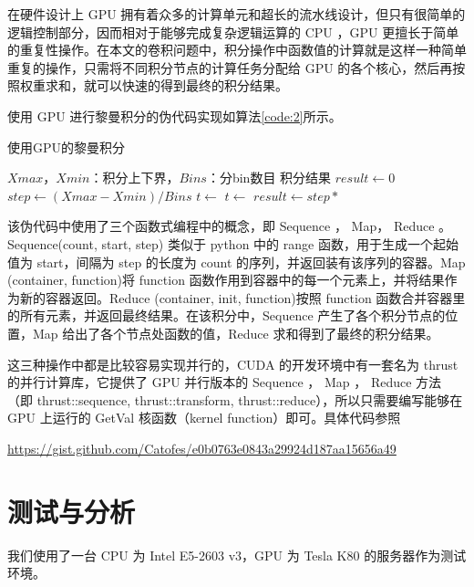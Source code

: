在硬件设计上 GPU 拥有着众多的计算单元和超长的流水线设计，但只有很简单的逻辑控制部分，因而相对于能够完成复杂逻辑运算的 CPU ，GPU 更擅长于简单的重复性操作。在本文的卷积问题中，积分操作中函数值的计算就是这样一种简单重复的操作，只需将不同积分节点的计算任务分配给 GPU 的各个核心，然后再按照权重求和，就可以快速的得到最终的积分结果。

使用 GPU 进行黎曼积分的伪代码实现如算法\ref{code:2}所示。
\begin{algorithm}  
    \caption{使用GPU的黎曼积分}  
    \begin{algorithmic}[1] 
        \Require 
            $Xmax$，$Xmin$：积分上下界，$Bins$：分bin数目
        \Ensure 
            积分结果
            \State $result \gets 0$  
            \State $step \gets (Xmax - Xmin) / Bins$
            \State $t \gets $
            \State $t \gets $
            \State $result \gets step * $
            \State {}
        \EndFunction

    \end{algorithmic}  
    \label{code:2}
\end{algorithm} 
该伪代码中使用了三个函数式编程中的概念，即 Sequence ， Map， Reduce 。 Sequence(count, start, step) 类似于 python 中的 range 函数，用于生成一个起始值为 start，间隔为 step 的长度为 count 的序列，并返回装有该序列的容器。Map (container, function)将 function 函数作用到容器中的每一个元素上，并将结果作为新的容器返回。Reduce (container, init, function)按照 function 函数合并容器里的所有元素，并返回最终结果。在该积分中，Sequence 产生了各个积分节点的位置，Map 给出了各个节点处函数的值，Reduce 求和得到了最终的积分结果。

这三种操作中都是比较容易实现并行的，CUDA 的开发环境中有一套名为 thrust 的并行计算库\supercite{thrust}，它提供了 GPU 并行版本的 Sequence ， Map ， Reduce 方法（即 thrust::sequence, thrust::transform, thrust::reduce），所以只需要编写能够在 GPU 上运行的 GetVal 核函数（kernel function）即可。具体代码参照

\url{https://gist.github.com/Catofes/e0b0763e0843a29924d187aa15656a49}

\section{测试与分析}

我们使用了一台 CPU 为 Intel E5-2603 v3，GPU 为 Tesla K80 的服务器作为测试环境。

